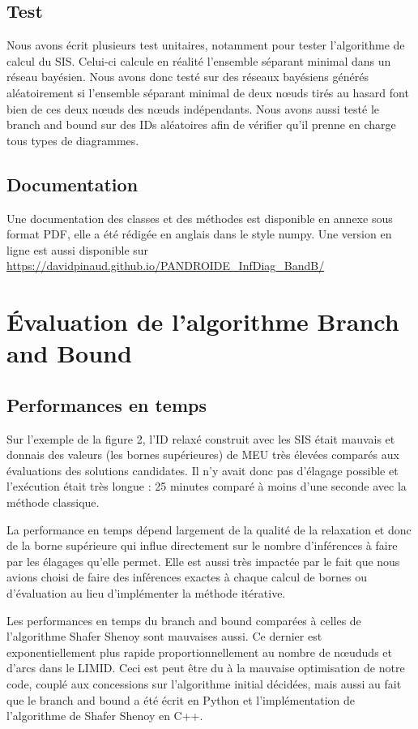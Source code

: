 \documentclass[12pt]{article}
\begin{document}
\subsection{Test}
Nous avons écrit plusieurs test unitaires, notamment pour tester l'algorithme de calcul du SIS. Celui-ci calcule en réalité l'ensemble séparant minimal dans un réseau bayésien. Nous avons donc testé sur des réseaux bayésiens générés aléatoirement si l'ensemble séparant minimal de deux nœuds tirés au hasard font bien de ces deux nœuds des nœuds indépendants. Nous avons aussi testé le branch and bound sur des IDs aléatoires afin de vérifier qu'il prenne en charge tous types de diagrammes.

\subsection{Documentation}
Une documentation des classes et des méthodes est disponible en annexe sous format PDF, elle a été rédigée en anglais dans le style numpy. Une version en ligne est aussi disponible sur \url{https://davidpinaud.github.io/PANDROIDE_InfDiag_BandB/}
\section{Évaluation de l'algorithme Branch and Bound}
\subsection{Performances en temps}
Sur l'exemple de la figure 2, l'ID relaxé construit avec les SIS était mauvais et donnais des valeurs (les bornes supérieures) de MEU très élevées comparés aux évaluations des solutions candidates. Il n'y avait donc pas d'élagage possible et l'exécution était très longue : 25 minutes comparé à moins d'une seconde avec la méthode classique.

La performance en temps dépend largement de la qualité de la relaxation et donc de la borne supérieure qui influe directement sur le nombre d'inférences à faire par les élagages qu'elle permet. Elle est aussi très impactée par le fait que nous avions choisi de faire des inférences exactes à chaque calcul de bornes ou d'évaluation au lieu d'implémenter la méthode itérative.

Les performances en temps du branch and bound comparées à celles de l'algorithme Shafer Shenoy sont mauvaises aussi. Ce dernier est exponentiellement plus rapide proportionnellement au nombre de nœududs et d'arcs dans le LIMID. Ceci est peut être du à la mauvaise optimisation de notre code, couplé aux concessions sur l'algorithme initial décidées, mais aussi au fait que le branch and bound a été écrit en Python et l'implémentation de l'algorithme de Shafer Shenoy en C++.
\end{document}
